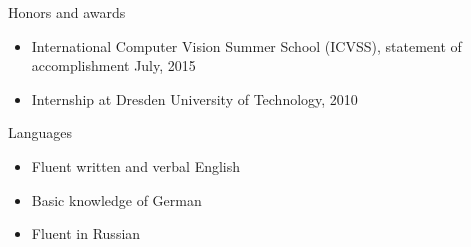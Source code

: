 \documentclass{resume} %
\begin{document}
\begin{rSection}{Honors and awards}
\begin{itemize}
\item {International Computer Vision Summer School (ICVSS), statement of accomplishment July, 2015} \\
\end{itemize}
\begin{itemize}
\item {Internship at Dresden University of Technology, 2010} \\
\end{itemize}

\end{rSection}


\begin{rSection}{Languages}
\begin{itemize}
\item {Fluent written and verbal English}
\item {Basic knowledge of German}
\item {Fluent in Russian}
\end{itemize}

\end{rSection}


\end{document}
